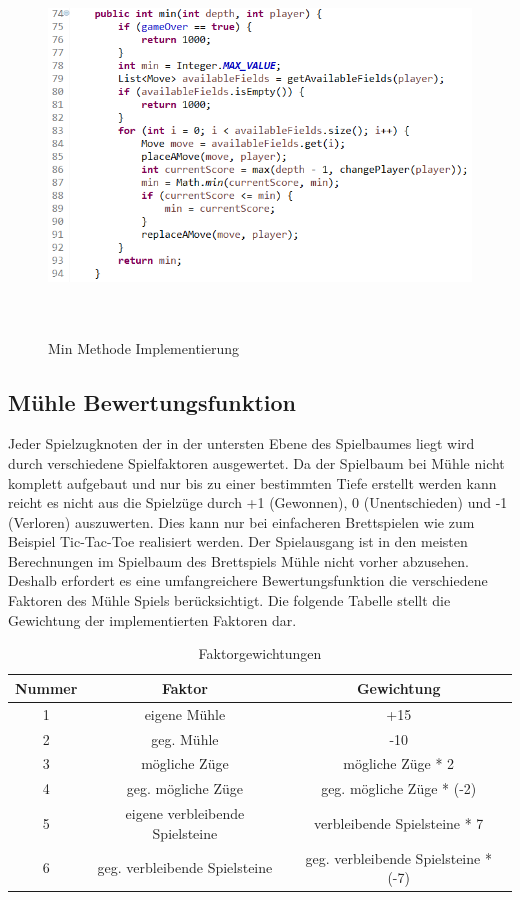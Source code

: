 \documentclass[oneside]{ausarbeitung}
\begin{document}
\begin{figure}[ht]
	\centering
	\includegraphics[width=12.5cm,height=10cm]{images/minMethode.png}
	\caption[Min Methode Implementierung]{Min Methode Implementierung}
\end{figure}

\clearpage

\subsection{Mühle Bewertungsfunktion}

Jeder Spielzugknoten der in der untersten Ebene des Spielbaumes liegt wird durch verschiedene Spielfaktoren ausgewertet. Da der Spielbaum bei Mühle nicht komplett aufgebaut und nur bis zu einer bestimmten Tiefe erstellt werden kann reicht es nicht aus die Spielzüge durch +1 (Gewonnen), 0 (Unentschieden) und -1 (Verloren) auszuwerten. Dies kann nur bei einfacheren Brettspielen wie zum Beispiel Tic-Tac-Toe realisiert werden. Der Spielausgang ist in den meisten Berechnungen im Spielbaum des Brettspiels Mühle nicht vorher abzusehen. Deshalb erfordert es eine umfangreichere Bewertungsfunktion die verschiedene Faktoren des Mühle Spiels berücksichtigt. Die folgende Tabelle stellt die Gewichtung der implementierten Faktoren dar.

\begin{table}[H]
	\renewcommand{\arraystretch}{2}
	\begin{tabular}{|c||c||c|}
	\hline
	Nummer & Faktor & Gewichtung \\ \hline \hline
	1 & eigene Mühle & +15 \\ \hline
	2 & geg. Mühle & -10 \\ \hline
	3 & mögliche Züge & mögliche Züge * 2 \\ \hline
	4 & geg. mögliche Züge & geg. mögliche Züge * (-2) \\ \hline
	5 & eigene verbleibende Spielsteine & verbleibende Spielsteine * 7 \\ \hline
	6 & geg. verbleibende Spielsteine & geg. verbleibende Spielsteine * (-7) \\ \hline
	\end{tabular}
	\caption[Faktorgewichtungen]{Faktorgewichtungen}
\end{table}
\end{document}
